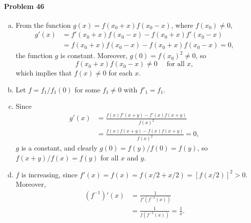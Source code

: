 \documentclass{article}
\begin{document}
\paragraph{Problem 46}
\begin{enumerate}[(a)]
  \item From the function $g(x) = f(x_0 + x)f(x_0 - x)$, where $f(x_0) \neq 0$,
    \begin{align*}
      g'(x) &= f'(x_0 + x)f(x_0 - x) - f(x_0 + x)f'(x_0 - x) \\
            &= f(x_0 + x)f(x_0 - x) - f(x_0 + x)f(x_0 - x) = 0,
    \end{align*}
    the function $g$ is constant. Moreover, $g(0) = f(x_0)^2 \neq 0$, so \[
      f(x_0 + x)f(x_0 - x) \neq 0\quad \text{ for all } x,
    \] which implies that $f(x) \neq 0$ for each $x$.
  \item Let $f = f_1/f_1(0)$ for some $f_1 \neq 0$ with $f'_1 = f_1$.
  \item Since
    \begin{align*}
      g'(x) &= \frac{f(x)f'(x + y) - f'(x)f(x + y)}{f(x)^2} \\
           &= \frac{f(x)f(x + y) - f(x)f(x + y)}{f(x)^2} = 0,
    \end{align*} $g$ is a constant, and clearly $g(0) = f(y)/f(0) = f(y)$, so
    $f(x + y)/f(x) = f(y)$ for all $x$ and $y$.
  \item $f$ is increasing, since $f'(x) = f(x) = f(x/2 + x/2) = [f(x/2)]^2 >
    0$. Moreover,
    \begin{align*}
      (f^{-1})'(x) &= \frac{1}{f'(f^{-1}(x))} \\
                   &= \frac{1}{f(f^{-1}(x))} = \frac{1}{x}.
    \end{align*}
\end{enumerate}
\end{document}
